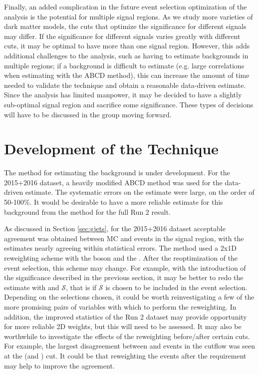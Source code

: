 Finally, an added complication in the future event selection optimization of the analysis is the potential for multiple signal regions. As we study more varieties of dark matter models, the cuts that optimize the significance for different signals may differ. If the significance for different signals varies greatly with different cuts, it may be optimal to have more than one signal region. However, this adds additional challenges to the analysis, such as having to estimate backgrounds in multiple regions; if a background is difficult to estimate (e.g. large correlations when estimating \Zjets with the ABCD method), this can increase the amount of time needed to validate the technique and obtain a reasonable data-driven estimate. Since the analysis has limited manpower, it may be decided to have a slightly sub-optimal signal region and sacrifice some significance. These types of decisions will have to be discussed in the group moving forward.


\section{Development of the \gjets Technique}

The \gjets method for estimating the \Zjets background is under development. For the 2015+2016 dataset, a heavily modified ABCD method was used for the \Zjets data-driven estimate. The systematic errors on the estimate were large, on the order of 50-100\%. It would be desirable to have a more reliable estimate for this background from the \gjets method for the full Run 2 result.

As discussed in Section \ref{sec:gjets}, for the 2015+2016 dataset acceptable agreement was obtained between MC \gjets and \Zjets events in the signal region, with the estimates nearly agreeing within statistical errors. The method used a 2x1D reweighting scheme with the boson \pt and the \etmissht. After the reoptimization of the event selection, this scheme may change. For example, with the introduction of the \etmiss significance described in the previous section, it may be better to redo the \gjets estimate with \pt and $\mathcal{S}$, that is if $\mathcal{S}$ is chosen to be included in the event selection. Depending on the selections chosen, it could be worth reinvestigating a few of the more promising pairs of variables with which to perform the reweighting. In addition, the improved statistics of the Run 2 dataset may provide opportunity for more reliable 2D weights, but this will need to be assessed. It may also be worthwhile to investigate the effects of the reweighting before/after certain cuts. For example, the largest disagreement between \gjets and \Zjets events in the cutflow was seen at the \etmiss (and \etmissht) cut. It could be that reweighting the events after the \etmiss requirement may help to improve the agreement.

